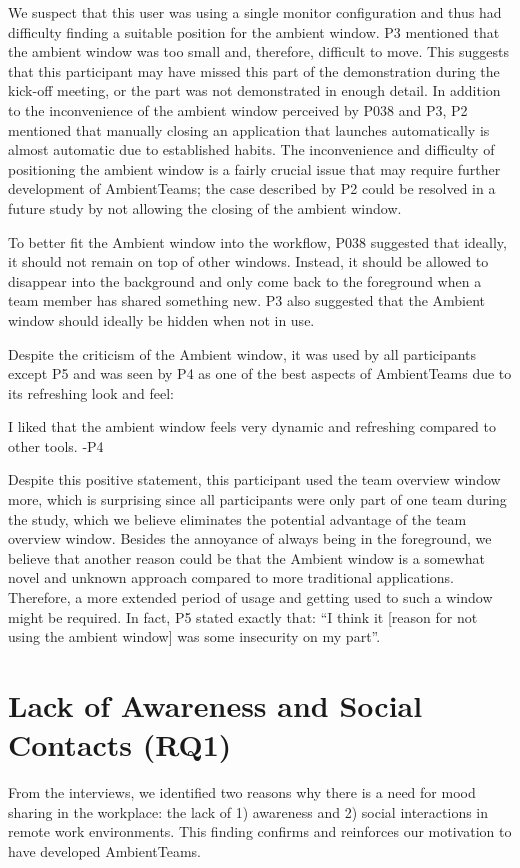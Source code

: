 We suspect that this user was using a single monitor configuration and thus had difficulty finding a suitable position for the ambient window. P3 mentioned that the ambient window was too small and, therefore, difficult to move. This suggests that this participant may have missed this part of the demonstration during the kick-off meeting, or the part was not demonstrated in enough detail. In addition to the inconvenience of the ambient window perceived by P038 and P3, P2 mentioned that manually closing an application that launches automatically is almost automatic due to established habits. The inconvenience and difficulty of positioning the ambient window is a fairly crucial issue that may require further development of AmbientTeams; the case described by P2 could be resolved in a future study by not allowing the closing of the ambient window.

To better fit the Ambient window into the workflow, P038 suggested that ideally, it should not remain on top of other windows. Instead, it should be allowed to disappear into the background and only come back to the foreground when a team member has shared something new. P3 also suggested that the Ambient window should ideally be hidden when not in use.

Despite the criticism of the Ambient window, it was used by all participants except P5 and was seen by P4 as one of the best aspects of AmbientTeams due to its refreshing look and feel:

\begin{displayquote}
    I liked that the ambient window feels very dynamic and refreshing compared to other tools. -P4
\end{displayquote}

Despite this positive statement, this participant used the team overview window more, which is surprising since all participants were only part of one team during the study, which we believe eliminates the potential advantage of the team overview window. Besides the annoyance of always being in the foreground, we believe that another reason could be that the Ambient window is a somewhat novel and unknown approach compared to more traditional applications. Therefore, a more extended period of usage and getting used to such a window might be required. In fact, P5 stated exactly that: \enquote{I think it [reason for not using the ambient window] was some insecurity on my part}.

\section{Lack of Awareness and Social Contacts (RQ1)}
From the interviews, we identified two reasons why there is a need for mood sharing in the workplace: the lack of 1) awareness and 2) social interactions in remote work environments. This finding confirms and reinforces our motivation to have developed AmbientTeams.

